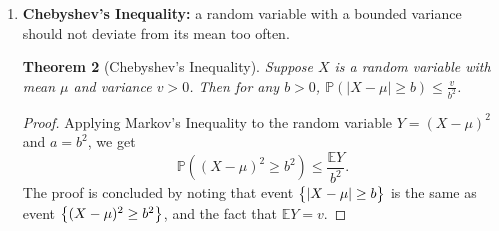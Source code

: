 \documentclass{article}
\newtheorem{theorem}{Theorem}
\newcommand{\EE}{\mathbb{E}} %
\newcommand{\PP}{\mathbb{P}} %
\newcommand*{\one}{{\bf 1}}
\begin{document}
\begin{enumerate}
\begin{theorem}[Markov's Inequality]
Suppose $X$ is a nonnegative random variable. Then for any $a > 0$,
$\PP(X \geq a) \leq \frac{\EE X}{a}$.
\end{theorem}
\begin{proof}
Observe that for any positive $x$, $x \geq a \one(x \geq a)$.
Therefore,
\[ \EE X \geq \EE a \one(X \geq a) = a \PP(X \geq a). \]
The proof is concluded by dividing both sides by $a$.
\end{proof}

\item \textbf{Chebyshev's Inequality:} a random variable with a bounded variance
should not deviate from its mean too often.

\begin{theorem}[Chebyshev's Inequality]
Suppose $X$ is a random variable with mean $\mu$ and variance $v > 0$. Then for any
$b > 0$,
$\PP( | X - \mu | \geq b ) \leq \frac{v}{b^2}$.
\end{theorem}
\begin{proof}
Applying Markov's Inequality to the random variable $Y = (X-\mu)^2$ and $a = b^2$,
we get
\[ \PP((X-\mu)^2 \geq b^2) \leq \frac{\EE Y}{b^2}. \]
The proof is concluded by noting that event $\cbr{| X - \mu | \geq b}$ is
the same as event $\cbr{( X - \mu )^2 \geq b^2}$, and the fact that
$\EE Y = v$.
\end{proof}
\end{enumerate}
\end{document}
